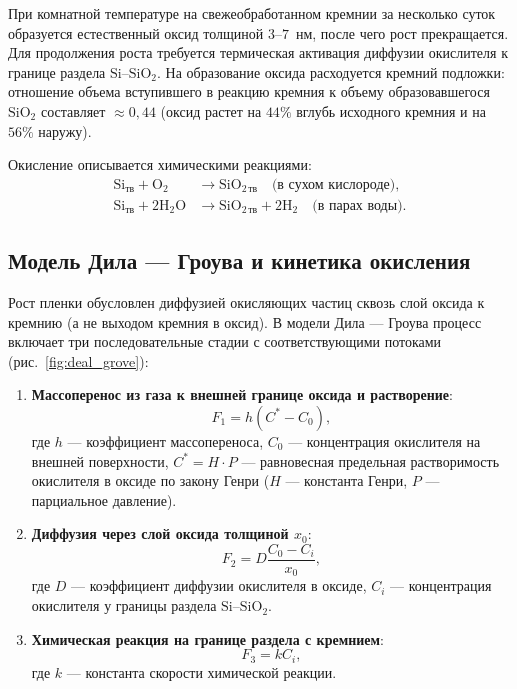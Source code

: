 \documentclass[12pt,a4paper]{article}
\theoremstyle{plain}
\theoremstyle{definition}
\theoremstyle{remark}
\numberwithin{equation}{section}
\begin{document}
При комнатной температуре на свежеобработанном кремнии за несколько суток образуется естественный оксид толщиной $3\text{--}7$~нм, после чего рост прекращается. Для продолжения роста требуется термическая активация диффузии окислителя к границе раздела $\mathrm{Si}\text{--}\mathrm{SiO}_2$. На образование оксида расходуется кремний подложки: отношение объема вступившего в реакцию кремния к объему образовавшегося $\mathrm{SiO}_2$ составляет $\approx 0{,}44$ (оксид растет на $44\%$ вглубь исходного кремния и на $56\%$ наружу).

Окисление описывается химическими реакциями:
\begin{align}
    \mathrm{Si}_\text{тв} + \mathrm{O}_2 &\to \mathrm{SiO}_{2\,\text{тв}} \quad \text{(в сухом кислороде)}, \\
    \mathrm{Si}_\text{тв} + 2\mathrm{H}_2\mathrm{O} &\to \mathrm{SiO}_{2\,\text{тв}} + 2\mathrm{H}_2 \quad \text{(в парах воды)}.
\end{align}

\subsection{Модель Дила — Гроува и кинетика окисления}

Рост пленки обусловлен диффузией окисляющих частиц сквозь слой оксида к кремнию (а не выходом кремния в оксид). В модели Дила — Гроува процесс включает три последовательные стадии с соответствующими потоками (рис.~\ref{fig:deal_grove}):
\begin{enumerate}
    \item \textbf{Массоперенос из газа к внешней границе оксида и растворение}:
    \begin{equation}
        F_1 = h(C^* - C_0),
    \end{equation}
    где $h$ — коэффициент массопереноса, $C_0$ — концентрация окислителя на внешней поверхности, $C^* = H \cdot P$ — равновесная предельная растворимость окислителя в оксиде по закону Генри ($H$ — константа Генри, $P$ — парциальное давление).
    \item \textbf{Диффузия через слой оксида толщиной $x_0$}:
    \begin{equation}
        F_2 = D \frac{C_0 - C_i}{x_0},
    \end{equation}
    где $D$ — коэффициент диффузии окислителя в оксиде, $C_i$ — концентрация окислителя у границы раздела $\mathrm{Si}\text{--}\mathrm{SiO}_2$.
    \item \textbf{Химическая реакция на границе раздела с кремнием}:
    \begin{equation}
        F_3 = k C_i,
    \end{equation}
    где $k$ — константа скорости химической реакции.
\end{enumerate}
\end{document}
